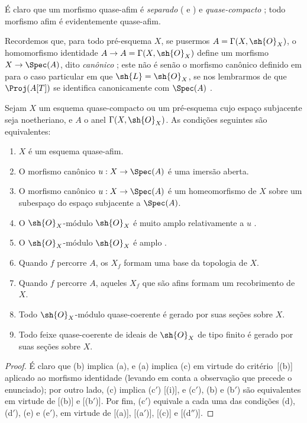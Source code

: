 \documentclass[oneside,10pt]{amsart}
\makeatletter
\newcommand{\ega@arrow}[2]{\mathchoice{#1}{#2}{#2}{#2}}
\renewcommand{\to}{\ega@arrow{\longrightarrow}{\rightarrow}}
\newcommand{\oldpage}[2][]{\marginnote{\normalfont\footnotesize\textbf{#1}~|~#2}\ignorespaces}
\let\EGAOriginalLabel\label
\renewcommand{\label}[1]{\phantomsection\EGAOriginalLabel{#1}}
\makeatother
\begin{document}
É claro que um morfismo quase-afim é \emph{separado} ( e ) e \emph{quase-compacto} ;
todo morfismo afim é evidentemente quase-afim.

Recordemos que, para todo pré-esquema $X$, se pusermos $A=\Gamma(X,\sh{O}_X)$, o homomorfismo identidade $A\to A=\Gamma(X,\sh{O}_X)$ define um morfismo $X\to\Spec(A)$, dito \emph{canônico} ;
este não é senão o morfismo canônico definido em  para o caso particular em que $\sh{L}=\sh{O}_X$, se nos lembrarmos de que $\Proj(A[T])$ se identifica canonicamente com $\Spec(A)$ .

\begin{proposition}[5.1.2]
\label{II.5.1.2}
Sejam $X$ um esquema quase-compacto ou um pré-esquema cujo espaço subjacente seja noetheriano, e $A$ o anel $\Gamma(X,\sh{O}_X)$.
As condições seguintes são equivalentes:
\begin{enumerate}
  \item[{\rm(a)}] $X$ é um esquema quase-afim.
  \item[{\rm(b)}] O morfismo canônico $u:X\to\Spec(A)$ é uma imersão aberta.
  \item[{\rm(b')}] O morfismo canônico $u:X\to\Spec(A)$ é um homeomorfismo de $X$ sobre um subespaço do espaço subjacente a $\Spec(A)$.
  \item[{\rm(c)}] O $\sh{O}_X$-módulo $\sh{O}_X$ é muito amplo relativamente a $u$ .
  \item[{\rm(c')}] O $\sh{O}_X$-módulo $\sh{O}_X$ é amplo .
  \item[{\rm(d)}] Quando $f$ percorre $A$, os $X_f$ formam uma base da topologia de $X$.
  \item[{\rm(d')}] Quando $f$ percorre $A$, aqueles $X_f$ que são afins formam um recobrimento de $X$.
\oldpage[II]{95}
  \item[{\rm(e)}] Todo $\sh{O}_X$-módulo quase-coerente é gerado por suas seções sobre $X$.
  \item[{\rm(e')}] Todo feixe quase-coerente de ideais de $\sh{O}_X$ de tipo finito é gerado por suas seções sobre $X$.
\end{enumerate}
\end{proposition}

\begin{proof}
É claro que (b) implica (a), e (a) implica (c) em virtude do critério~[(b)] aplicado ao morfismo identidade (levando em conta a observação que precede o enunciado);
por outro lado, (c) implica (c$'$) [(i)], e (c$'$), (b) e (b$'$) são equivalentes em virtude de [(b)] e [(b$'$)].
Por fim, (c$'$) equivale a cada uma das condições (d), (d$'$), (e) e (e$'$), em virtude de [(a)], [(a$'$)], [(c)] e [(d$''$)].
\end{proof}
\end{document}
